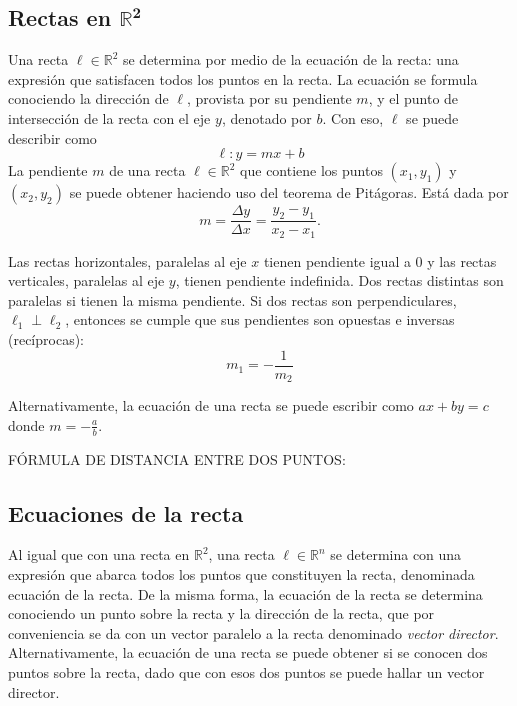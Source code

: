 \documentclass{fmbnotes}
\begin{document}
\subsection[Rectas en \(\mathbb{R}^{2}\)]{Rectas en \(\bm{\mathbb{R}^{2}}\)}
Una recta \( \ell \in \mathbb{R}^{2} \) se determina por medio de la ecuación de la recta: una expresión que satisfacen todos los puntos en la recta. La ecuación se formula conociendo la dirección de \(\ell\), provista por su pendiente \(m\), y el punto de intersección de la recta con el eje \(y\), denotado por \(b\). Con eso, \(\ell\) se puede describir como
\[\ell: y=m x+b \]
La pendiente \( m \) de una recta \( \ell \in \mathbb{R}^{2} \) que contiene los puntos \( \left(x_{1}, y_{1}\right) \) y \( \left(x_{2}, y_{2}\right) \) se puede obtener haciendo uso del teorema de Pitágoras. Está dada por
\[ m=\frac{\Delta y}{\Delta x}=\frac{y_{2}-y_{1}}{x_{2}-x_{1}} .\]

Las rectas horizontales, paralelas al eje \( x \) tienen pendiente igual a 0 y las rectas verticales, paralelas al eje \( y \), tienen pendiente indefinida. Dos rectas distintas son paralelas si tienen la misma pendiente. Si dos rectas son perpendiculares, \( \ell_{1} \perp \ell_{2} \), entonces se cumple que sus pendientes son opuestas e inversas (recíprocas):
\[ m_{1}=-\frac{1}{m_{2}} \]

Alternativamente, la ecuación de una recta se puede escribir como \( a x+b y=c \) donde \( m=-\frac{a}{b} \). 

FÓRMULA DE DISTANCIA ENTRE DOS PUNTOS:

\subsection{ Ecuaciones de la recta}
Al igual que con una recta en \(\mathbb{R}^{2}\), una recta \(\ell \in \mathbb{R}^{n}\) se determina con una expresión que abarca todos los puntos que constituyen la recta, denominada ecuación de la recta. De la misma forma, la ecuación de la recta se determina conociendo un punto sobre la recta y la dirección de la recta, que por conveniencia se da con un vector paralelo a la recta denominado \emph{vector director}. Alternativamente, la ecuación de una recta se puede obtener si se conocen dos puntos sobre la recta, dado que con esos dos puntos se puede hallar un vector director.
\end{document}
